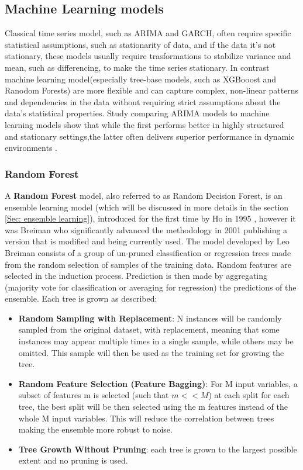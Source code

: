 \subsection{Machine Learning models} %
Classical time series model, such as ARIMA and GARCH, often require specific statistical assumptions, such as stationarity of data, and if the data it's not stationary, these models usually require trasformations to stabilize variance and mean, such as differencing, to make the time series stationary. In contrast machine learning model(especially tree-base models, such as XGBooost and Ranodom Forests) are more flexible and can capture complex, non-linear patterns and dependencies in the data without requiring strict assumptions about the data's statistical properties. Study comparing ARIMA models to machine learning models show that while the first performs better in highly structured and stationary settings,the latter often delivers superior performance in dynamic environments \cite{Kontopoulou2023}.

\subsubsection{Random Forest}
\label{Sec: Random Forest}
A \textbf{Random Forest} model, also referred to as Random Decision Forest, is an ensemble learning model (which will be discussed in more details in the section \ref{Sec: ensemble learning}), introduced for the first time by Ho in 1995 \cite{Ho1995}, however it was Breiman who significantly advanced the methodology in 2001 \cite{Breiman2001} publishing a version that is modified and being currently used. The model developed by Leo Breiman consists of a group of un-pruned classification or regression trees made from the random selection of samples of the training data. Random features are selected in the induction process. Prediction is then made by aggregating (majority vote for classification or averaging for regression) the predictions of the ensemble. Each tree is grown as described:
\begin{itemize}
\item \textbf{Random Sampling with Replacement}: N instances will be randomly sampled from the original dataset, with replacement, meaning that some instances may appear multiple times in a single sample, while others may be omitted. This sample will then be used as the training set for growing the tree.
\item \textbf{Random Feature Selection (Feature Bagging)}: For M input variables, a subset of features m is selected (such that $m<<M$) at each split for each tree, the best split will be then selected using the m features instead of the whole M input variables. This will reduce the correlation between trees making the ensemble more robust to noise.
\item \textbf{Tree Growth Without Pruning}: each tree is grown to the largest possible extent and no pruning is used.
\end{itemize}

